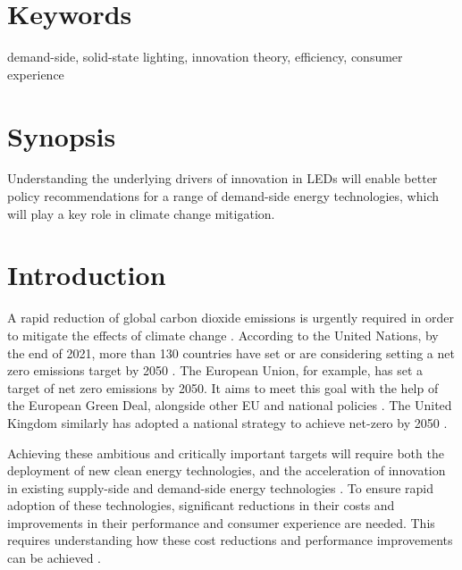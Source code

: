 \documentclass[journal=jacsat,manuscript=article]{achemso}
\begin{document}

\section{Keywords}

demand-side, solid-state lighting, innovation theory, efficiency, consumer experience

\section{Synopsis}

Understanding the underlying drivers of innovation in LEDs will enable better policy recommendations for a range of demand-side energy technologies, which will play a key role in climate change mitigation.

\section{Introduction}
\label{sec:intro}

A rapid reduction of global carbon dioxide emissions is urgently required in order to mitigate the effects of climate change \cite{Forster2019}. According to the United Nations, by the end of 2021, more than 130 countries have set or are considering setting a net zero emissions target by 2050 \cite{un2021climate}. The European Union, for example, has set a target of net zero emissions by 2050. It aims to meet this goal with the help of the European Green Deal, alongside other EU and national policies \cite{eu2020green}. The United Kingdom similarly has adopted a national strategy to achieve net-zero by 2050 \cite{noauthor_ieairena_2023}.

Achieving these ambitious and critically important targets will require both the deployment of new clean energy technologies, and the acceleration of innovation in existing supply-side \cite{sinn2012green} and demand-side energy technologies \cite{rgeVorsatz2009}. To ensure rapid adoption of these technologies, significant reductions in their costs and improvements in their performance and consumer experience are needed. This requires understanding how these cost reductions and performance improvements can be achieved \cite{Stephan2021,Ziegler2021}.
\end{document}
